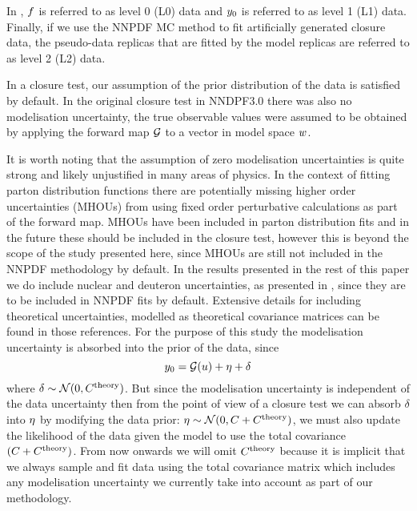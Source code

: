 In \cite{nnpdf30}, $f$ is referred to as
level 0 (L0) data and $y_0$ is referred to as level 1 (L1) data.
Finally, if we use the NNPDF MC method to fit artificially generated closure
data, the pseudo-data replicas that are fitted by the
model replicas are referred to as level 2 (L2) data.

In a closure test, our assumption of the prior distribution of the data is
satisfied by default. In the original closure test in NNDPF3.0 there was also no
modelisation uncertainty, the true observable values were assumed to be obtained
by applying the forward map $\mathcal{G}$ to a vector in model space $w$.

It is worth noting that the assumption of zero modelisation uncertainties is
quite strong and likely unjustified in many areas of physics. In the context of
fitting parton distribution functions there are potentially missing higher order
uncertainties (MHOUs) from using fixed order perturbative calculations as part
of the forward map. MHOUs have been included in parton distribution fits
\cite{AbdulKhalek:2019ihb} and in the future these should be included in the
closure test, however this is beyond the scope of the study presented here,
since MHOUs are still not included in the NNPDF methodology by default. In the
results presented in the rest of this paper we do include nuclear and deuteron
uncertainties, as presented in \cite{Ball:2018twp, Ball:2020xqw}, since they are
to be included in NNPDF fits by default. Extensive details for including
theoretical uncertainties, modelled as theoretical covariance matrices can be
found in those references. For the purpose of this study the modelisation
uncertainty is absorbed into the prior of the data, since
\begin{equation}
    y_0 = \mathcal{G}(u) + \eta + \delta
\end{equation}
where $\delta \sim \mathcal{N}(0, C^{\rm theory})$. But since the modelisation
uncertainty is independent of the data uncertainty then from the point of view
of a closure test we can absorb $\delta$ into $\eta$ by modifying the data
prior: $\eta \sim \mathcal{N}(0, C + C^{\rm theory})$, we must also update the
likelihood of the data given the model to use the total covariance $(C + C^{\rm
theory})$. From now onwards we will omit $C^{\rm theory}$ because it is
implicit that we always sample and fit data using the total covariance matrix
which includes any modelisation uncertainty we currently take into account as
part of our methodology.
